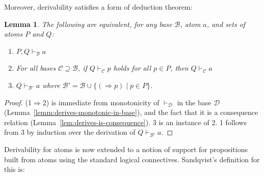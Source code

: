 \documentclass{sn-jnl}
\newcommand{\derives}[1]{\vdash_{\!#1}}
\newcommand{\base}[1]{\mathscr{#1}}
\renewcommand{\derives}[2]{\vdash_{\base{#1}}#2}
\newtheorem{lemma}[theorem]{Lemma}
\begin{document}
\smallskip 

Moreover, derivability satisfies a form of deduction theorem: 

\smallskip 

\begin{lemma}\label{lem:derives-deduction}
    The following are equivalent, for any base $\base{B}$, atom $a$, and sets of atoms $P$ and $Q$:
    \begin{enumerate}
        \item $P,Q\derives{B}{a}$
        \item For all bases $\base{C}\supseteq\base{B}$, if $Q\derives{C}{p}$ holds for all $p\in P$, then $Q\derives{C}{a}$
        \item $Q\derives{B'}{a}$ where $\base{B'} = \base{B} \cup \{ (\Rightarrow p) \mid p\in P\}$. 
    \end{enumerate}
\end{lemma}
\begin{proof}
    (1$\Rightarrow$2) is immediate from monotonicity of $\derives{D}{}$ in the base $\base{D}$ (Lemma~\ref{lemm:derives-monotonic-in-base}), and the fact that it is a consequence relation (Lemma~\ref{lem:derives-is-consequence}). 3 is an instance of 2. 1 follows from 3 by induction over the derivation of 
    $Q\derives{B'}{a}$. 
\end{proof}

Derivability for atoms is now extended to a notion of support for propositions built from atoms using the standard logical connectives.
Sandqvist's definition for this is: 

\smallskip  
\end{document}
